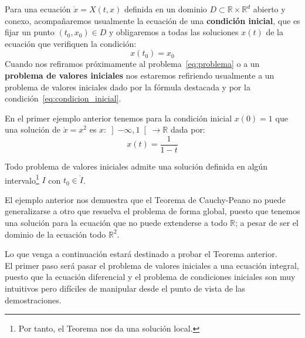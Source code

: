 \noindent
Para una ecuación $\dot{x} = X(t,x)$ definida en un dominio $D\subset\mathbb{R}\times \mathbb{R}^d$ abierto y conexo, acompañaremos usualmente la ecuación de una \textbf{condición inicial}, que es fijar un punto $(t_0,x_0)\in D$ y obligaremos a todas las soluciones $x(t)$ de la ecuación que verifiquen la condición:
\begin{equation}\label{eq:condicion_inicial}
    x(t_0) = x_0
\end{equation}
Cuando nos refiramos próximamente al problema~\eqref{eq:problema} o a un \textbf{problema de valores iniciales} nos estaremos refiriendo usualmente a un problema de valores iniciales dado por la fórmula destacada y por la condición~\eqref{eq:condicion_inicial}.

\begin{ejemplo}
    En el primer ejemplo anterior tenemos para la condición inicial $x(0) = 1$ que una solución de $\dot{x} = x^2$ es $x:\left]-\infty,1\right[\to \mathbb{R}$ dada por:
    \begin{equation*}
        x(t) = \frac{1}{1-t}
    \end{equation*}
\end{ejemplo}

\begin{teo}\label{teo:existencia}
    Todo problema de valores iniciales admite una solución definida en algún intervalo\footnote{Por tanto, el Teorema nos da una solución local.} $I$ con $t_0\in \mathring{I}$.
\end{teo}

\begin{observacion}
    El ejemplo anterior nos demuestra que el Teorema de Cauchy-Peano no puede generalizarse a otro que resuelva el problema de forma global, puesto que tenemos una solución para la ecuación que no puede extenderse a todo $\mathbb{R}$; a pesar de ser el dominio de la ecuación todo $\mathbb{R}^2$.
\end{observacion}

\noindent
Lo que venga a continuación estará destinado a probar el Teorema anterior.\\

\noindent
El primer paso será pasar el problema de valores iniciales a una ecuación integral, puesto que la ecuación diferencial y el problema de condiciones iniciales son muy intuitivos pero difíciles de manipular desde el punto de vista de las demostraciones.

